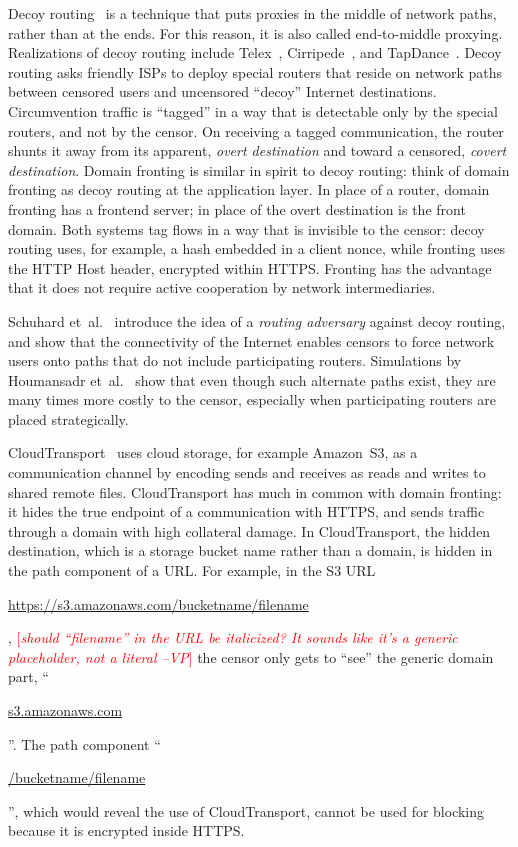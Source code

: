 \documentclass{sig-alternate}
\def\urll#1{\begin{NoHyper}\url{#1}\end{NoHyper}}
\newcommand{\note}[1]{{\textcolor{red}{[\textit{#1}]}}}
\newcommand{\vp}[1]{\note{#1 --VP}}
\begin{document}
Decoy routing~\cite{decoyrouting}
is a technique that puts
proxies in the middle of network paths, rather than at the ends.
For this reason, it is also called end-to-middle proxying.
Realizations of decoy routing include Telex~\cite{telex},
Cirripede~\cite{cirripede}, and TapDance~\cite{tapdance}.
Decoy routing asks friendly ISPs to deploy special routers that reside
on network paths between censored users and uncensored ``decoy'' Internet destinations.
Circumvention traffic is ``tagged'' in a way that is detectable only
by the special routers, and not by the censor.
On receiving a tagged communication, the router shunts it away from its apparent, \emph{overt destination}
and toward a censored, \emph{covert destination}.
Domain fronting is similar in spirit to decoy routing:
think of domain fronting as decoy routing at the application layer.
In place of a router, domain fronting has a frontend server;
in place of the overt destination is the front domain.
Both systems tag flows in a way that is invisible to the censor:
decoy routing uses, for example, a hash embedded in a client nonce,
while fronting uses the HTTP Host header, encrypted within HTTPS.
Fronting has the advantage that it does not require active cooperation by network intermediaries.

Schuhard et~al.~\cite{ccs2012-decoys}
introduce the idea of a \emph{routing adversary} against decoy routing,
and show that the connectivity of the Internet enables
censors to force network users onto paths that do not include participating routers.
Simulations by Houmansadr et~al.~\cite{nodirectionhome}
show that even though such alternate paths exist,
they are many times more costly to the censor,
especially when participating routers are placed strategically.

CloudTransport~\cite{cloudtransport} uses cloud storage, for example Amazon~S3,
as a communication channel by encoding sends and receives as reads and writes to shared remote files.
CloudTransport has much in common with domain fronting:
it hides the true endpoint of a communication with HTTPS,
and sends traffic through a domain with high collateral damage.
In CloudTransport, the hidden destination, which is a storage bucket name rather than a domain,
is hidden in the path component of a URL.
For example, in the S3 URL
\urll{https://s3.amazonaws.com/bucketname/filename},
\vp{should ``filename'' in the URL be italicized?  It sounds like it's
a generic placeholder, not a literal}
the censor only gets to ``see'' the generic domain part, ``\urll{s3.amazonaws.com}''.
The path component ``\urll{/bucketname/filename}'',
which would reveal the use of CloudTransport,
cannot be used for blocking because it is encrypted inside HTTPS.
\end{document}
